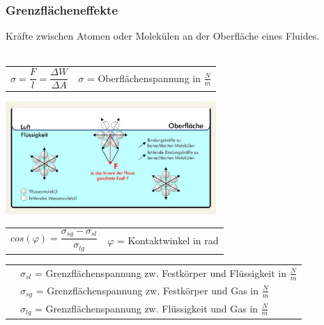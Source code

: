 	\subsubsection{Grenzflächeneffekte}
		\begin{minipage}[t]{10.5cm}
			\newline
			Kräfte zwischen Atomen oder Molekülen an der Oberfläche eines Fluides.\\ \\
			\renewcommand{\arraystretch}{2.5}
			\begin{tabular}{ p{4cm} | p{7cm}}
				$\sigma = \dfrac{F}{l} = \dfrac{\Delta W}{\Delta A}$	&	$\sigma$ = Oberflächenspannung in $\frac{N}{m}$\\
			\end{tabular}
			\renewcommand{\arraystretch}{1}
		\end{minipage}
		\begin{minipage}[t]{10cm}
			\vspace{-\ht\strutbox}\includegraphics[width=8cm]{./bilder/VanDerWaalsKraft.jpg}
		\end{minipage}
		\newline
		\newline
		\newline
		\begin{minipage}[t]{12cm}
			\renewcommand{\arraystretch}{2.5}
			\begin{tabular}{ p{4cm} | p{7cm}}
				$cos(\varphi) = \dfrac{\sigma_{sg}-\sigma_{sl}}{\sigma_{lg}}$	&	$\varphi$ = Kontaktwinkel in rad\\
			\end{tabular}
			\renewcommand{\arraystretch}{1.5}
			\begin{tabular}{ p{4cm} | p{7cm}}
				& $\sigma_{sl}$ = Grenzflächenspannung zw. Festkörper und Flüssigkeit in $\frac{N}{m}$\\
				& $\sigma_{sg}$ = Grenzflächenspannung zw. Festkörper und Gas in $\frac{N}{m}$\\
				& $\sigma_{lg}$ = Grenzflächenspannung zw. Flüssigkeit und Gas in $\frac{N}{m}$\\
			\end{tabular}
			\renewcommand{\arraystretch}{1}
		\end{minipage}
